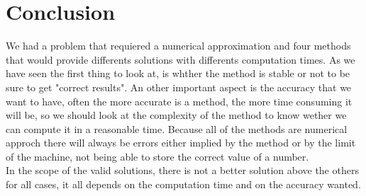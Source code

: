 \documentclass[12pt, a4paper]{report}
\begin{document}
\chapter*{Conclusion}
We had a problem that requiered a numerical approximation and four methods that would provide differents solutions with differents computation times. As we have seen the first thing to look at, is whther the method is stable or not to be sure to get "correct results". An other important aspect is the accuracy that we want to have, often the more accurate is a method, the more time consuming it will be, so we should look at the complexity of the method to know wether we can compute it in a reasonable time. Because all of the methods are numerical approch there will always be errors either implied by the method or by the limit of the machine, not being able to store the correct value of a number.\\
In the scope of the valid solutions, there is not a better solution above the others for all cases, it all depends on the computation time and on the accuracy wanted.
\end{document}
